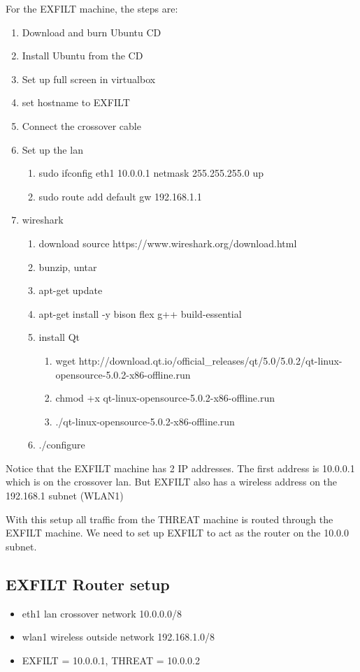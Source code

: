 \documentclass[dvipdfm]{book}
\begin{document}
For the EXFILT machine, the steps are:
\begin{enumerate}
\item Download and burn Ubuntu CD
\item Install Ubuntu from the CD
\item Set up full screen in virtualbox
\item set hostname to EXFILT
\item Connect the crossover cable
\item Set up the lan
\begin{enumerate}
\item sudo ifconfig eth1 10.0.0.1 netmask 255.255.255.0 up
\item sudo route add default gw 192.168.1.1
\end{enumerate}
\item wireshark
\begin{enumerate}
\item download source https://www.wireshark.org/download.html
\item bunzip, untar
\item apt-get update
\item apt-get install -y bison flex g++ build-essential
\item install Qt
\begin{enumerate}
\item wget http://download.qt.io/official\_releases/qt/5.0/5.0.2/qt-linux-opensource-5.0.2-x86-offline.run
\item chmod +x qt-linux-opensource-5.0.2-x86-offline.run
\item ./qt-linux-opensource-5.0.2-x86-offline.run
\end{enumerate}
\item ./configure
\end{enumerate}
\end{enumerate}
Notice that the EXFILT machine has 2 IP addresses. The first
address is 10.0.0.1 which is on the crossover lan. But EXFILT
also has a wireless address on the 192.168.1 subnet (WLAN1)

With this setup all traffic from the THREAT machine is routed
through the EXFILT machine. We need to set up EXFILT to act
as the router on the 10.0.0 subnet. 

\subsection{EXFILT Router setup}
\begin{itemize}
\item eth1 lan crossover network 10.0.0.0/8
\item wlan1 wireless outside network 192.168.1.0/8
\item EXFILT = 10.0.0.1, THREAT = 10.0.0.2
\end{itemize}
\end{document}
